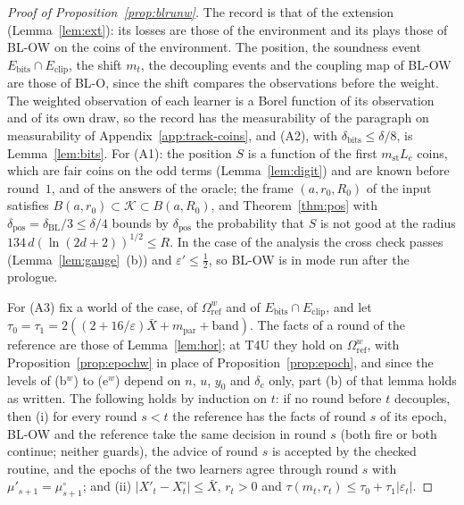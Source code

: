 \documentclass[11pt]{amsart}
\theoremstyle{definition}
\numberwithin{equation}{section}
\newcommand{\cK}{\mathcal{K}}
\begin{document}
\begin{proof}[Proof of Proposition~\ref{prop:blrunw}]
The record is that of the extension (Lemma~\ref{lem:ext}): its losses are those of the environment and its plays those of BL-OW on the coins of the environment. The position, the soundness event $E_{\mathrm{bits}}\cap E_{\mathrm{clip}}$, the shift $m_t$, the decoupling events and the coupling map of BL-OW are those of BL-O, since the shift compares the observations before the weight. The weighted observation of each learner is a Borel function of its observation and of its own draw, so the record has the measurability of the paragraph on measurability of Appendix~\ref{app:track-coins}, and (A2), with $\delta_{\mathrm{bits}}\le\delta/8$, is Lemma~\ref{lem:bits}. For (A1): the position $S$ is a function of the first $m_{\mathrm{st}}L_c$ coins, which are fair coins on the odd terms (Lemma~\ref{lem:digit}) and are known before round~$1$, and of the answers of the oracle; the frame $(a,r_0,R_0)$ of the input satisfies $B(a,r_0)\subset\cK\subset B(a,R_0)$, and Theorem~\ref{thm:pos} with $\delta_{\mathrm{pos}}=\delta_{\mathrm{BL}}/3\le\delta/4$ bounds by $\delta_{\mathrm{pos}}$ the probability that $S$ is not good at the radius $134\,d(\ln(2d+2))^{1/2}\le R$. In the case of the analysis the cross check passes (Lemma~\ref{lem:gauge}~(b)) and $\varepsilon'\le\frac12$, so BL-OW is in mode run after the prologue.

For (A3) fix a world of the case, of $\Omega^w_{\mathrm{ref}}$ and of $E_{\mathrm{bits}}\cap E_{\mathrm{clip}}$, and let $\tau_0=\tau_1=2((2+16/\varepsilon)\bar X+m_{\mathrm{par}}+\mathrm{band})$. The facts of a round of the reference are those of Lemma~\ref{lem:hor}; at T4U they hold on $\Omega^w_{\mathrm{ref}}$, with Proposition~\ref{prop:epochw} in place of Proposition~\ref{prop:epoch}, and since the levels of (b$^w$) to (e$^w$) depend on $n$, $u$, $y_0$ and $\delta_c$ only, part (b) of that lemma holds as written. The following holds by induction on $t$: if no round before $t$ decouples, then (i) for every round $s<t$ the reference has the facts of round $s$ of its epoch, BL-OW and the reference take the same decision in round $s$ (both fire or both continue; neither guards), the advice of round $s$ is accepted by the checked routine, and the epochs of the two learners agree through round $s$ with $\mu'_{s+1}=\mu^\circ_{s+1}$; and (ii) $|X'_t-X^\circ_t|\le\bar X$, $r_t>0$ and $\tau(m_t,r_t)\le\tau_0+\tau_1|\varepsilon_t|$.


\end{proof}
\end{document}
